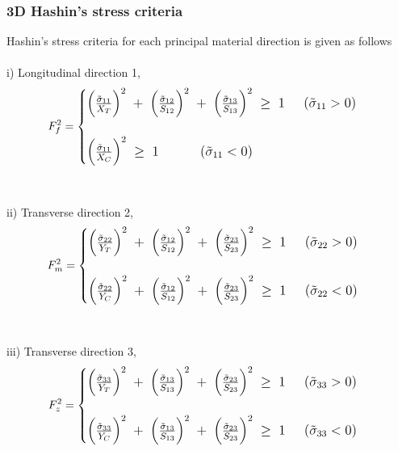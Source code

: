 \documentclass[a4paper,12pt]{extarticle}
\begin{document}
\subsubsection{3D Hashin's stress criteria}
\indent\indent\indent Hashin's stress criteria for each principal material direction is given as follows
\\
\\
i) Longitudinal direction 1,
\\
\begin{equation}
\large{F_{f}^{2} =  
	\begin{cases}
	\Big(\frac{\tilde{\sigma}_{11}}{X_{T}}\Big)^{2} \; + \; \Big(\frac{\tilde{\sigma}_{12}}{S_{12}}\Big)^{2} \; + \; \Big(\frac{\tilde{\sigma}_{13}}{S_{13}}\Big)^{2} \; \geq  \; 1  \; \; \; \; \;  (\tilde{\sigma}_{11}  >  0)  \\
	\\
	\Big(\frac{\tilde{\sigma}_{11}}{X_{C}}\Big)^{2}  \; \geq  \; 1 \; \; \; \; \; \; \;  \; \; \; \;  (\tilde{\sigma}_{11}  <  0) 
	
	\end{cases}}
\end{equation}
\\
\\
ii) Transverse direction 2,
\\
\begin{equation}
\large{F_{m}^{2} =  
	\begin{cases} 
		\Big(\frac{\tilde{\sigma}_{22}}{Y_{T}}\Big)^{2} \; + \; \Big(\frac{\tilde{\sigma}_{12}}{S_{12}}\Big)^{2} \; + \; \Big(\frac{\tilde{\sigma}_{23}}{S_{23}}\Big)^{2} \; \geq  \; 1  \; \; \; \; \;  (\tilde{\sigma}_{22}  >  0)  \\
		\\
		\Big(\frac{\tilde{\sigma}_{22}}{Y_{C}}\Big)^{2} \; + \; \Big(\frac{\tilde{\sigma}_{12}}{S_{12}}\Big)^{2} \; + \; \Big(\frac{\tilde{\sigma}_{23}}{S_{23}}\Big)^{2} \; \geq  \; 1  \; \; \; \; \;  (\tilde{\sigma}_{22}  <  0)  \\		
	\end{cases}}
\end{equation}
\\
\\
iii) Transverse direction 3,
\\
\begin{equation}
\large{F_{z}^{2} =  
	\begin{cases} 
		\Big(\frac{\tilde{\sigma}_{33}}{Y_{T}}\Big)^{2} \; + \; \Big(\frac{\tilde{\sigma}_{13}}{S_{13}}\Big)^{2} \; + \; \Big(\frac{\tilde{\sigma}_{23}}{S_{23}}\Big)^{2} \; \geq  \; 1  \; \; \; \; \;  (\tilde{\sigma}_{33}  >  0)  \\
		\\
		\Big(\frac{\tilde{\sigma}_{33}}{Y_{C}}\Big)^{2} \; + \; \Big(\frac{\tilde{\sigma}_{13}}{S_{13}}\Big)^{2} \; + \; \Big(\frac{\tilde{\sigma}_{23}}{S_{23}}\Big)^{2} \; \geq  \; 1  \; \; \; \; \;  (\tilde{\sigma}_{33}  <  0)  \\		
	\end{cases}}
\end{equation}
\end{document}
